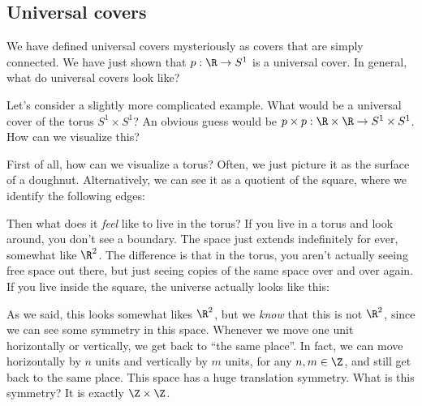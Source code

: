\documentclass[a4paper]{article}
\begin{document}
\subsection{Universal covers}
We have defined universal covers mysteriously as covers that are simply connected. We have just shown that $p: \R\to S^1$ is a universal cover. In general, what do universal covers look like?

Let's consider a slightly more complicated example. What would be a universal cover of the torus $S^1 \times S^1$? An obvious guess would be $p\times p: \R\times \R \to S^1 \times S^1$. How can we visualize this?

First of all, how can we visualize a torus? Often, we just picture it as the surface of a doughnut. Alternatively, we can see it as a quotient of the square, where we identify the following edges:
\begin{center}
\end{center}
Then what does it \emph{feel} like to live in the torus? If you live in a torus and look around, you don't see a boundary. The space just extends indefinitely for ever, somewhat like $\R^2$. The difference is that in the torus, you aren't actually seeing free space out there, but just seeing copies of the same space over and over again. If you live inside the square, the universe actually looks like this:
\begin{center}
\end{center}
As we said, this looks somewhat likes $\R^2$, but we \emph{know} that this is not $\R^2$, since we can see some symmetry in this space. Whenever we move one unit horizontally or vertically, we get back to ``the same place''. In fact, we can move horizontally by $n$ units and vertically by $m$ units, for any $n, m \in \Z$, and still get back to the same place. This space has a huge translation symmetry. What is this symmetry? It is exactly $\Z \times \Z$.
\end{document}
